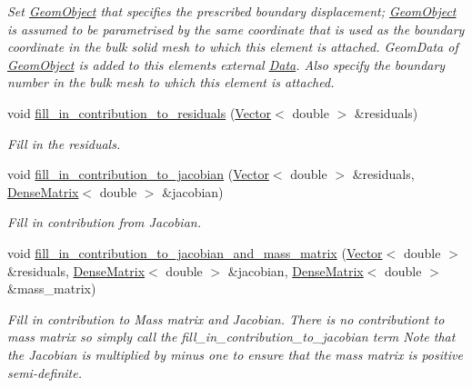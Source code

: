 \begin{DoxyCompactItemize}
\begin{DoxyCompactList}\small\item\em Set \hyperlink{classoomph_1_1GeomObject}{Geom\+Object} that specifies the prescribed boundary displacement; \hyperlink{classoomph_1_1GeomObject}{Geom\+Object} is assumed to be parametrised by the same coordinate that is used as the boundary coordinate in the bulk solid mesh to which this element is attached. Geom\+Data of \hyperlink{classoomph_1_1GeomObject}{Geom\+Object} is added to this element\textquotesingle{}s external \hyperlink{classoomph_1_1Data}{Data}. Also specify the boundary number in the bulk mesh to which this element is attached. \end{DoxyCompactList}\item 
void \hyperlink{classoomph_1_1ImposeDisplacementByLagrangeMultiplierElement_a1c65bc4013288cba24313e4cd1339919}{fill\+\_\+in\+\_\+contribution\+\_\+to\+\_\+residuals} (\hyperlink{classoomph_1_1Vector}{Vector}$<$ double $>$ \&residuals)
\begin{DoxyCompactList}\small\item\em Fill in the residuals. \end{DoxyCompactList}\item 
void \hyperlink{classoomph_1_1ImposeDisplacementByLagrangeMultiplierElement_a8f196eaf084264031cf36fb541978123}{fill\+\_\+in\+\_\+contribution\+\_\+to\+\_\+jacobian} (\hyperlink{classoomph_1_1Vector}{Vector}$<$ double $>$ \&residuals, \hyperlink{classoomph_1_1DenseMatrix}{Dense\+Matrix}$<$ double $>$ \&jacobian)
\begin{DoxyCompactList}\small\item\em Fill in contribution from Jacobian. \end{DoxyCompactList}\item 
void \hyperlink{classoomph_1_1ImposeDisplacementByLagrangeMultiplierElement_adf4f9f9359fbc7cd2acec4647dfa3c5a}{fill\+\_\+in\+\_\+contribution\+\_\+to\+\_\+jacobian\+\_\+and\+\_\+mass\+\_\+matrix} (\hyperlink{classoomph_1_1Vector}{Vector}$<$ double $>$ \&residuals, \hyperlink{classoomph_1_1DenseMatrix}{Dense\+Matrix}$<$ double $>$ \&jacobian, \hyperlink{classoomph_1_1DenseMatrix}{Dense\+Matrix}$<$ double $>$ \&mass\+\_\+matrix)
\begin{DoxyCompactList}\small\item\em Fill in contribution to Mass matrix and Jacobian. There is no contributiont to mass matrix so simply call the fill\+\_\+in\+\_\+contribution\+\_\+to\+\_\+jacobian term Note that the Jacobian is multiplied by minus one to ensure that the mass matrix is positive semi-\/definite. \end{DoxyCompactList}\item 

\end{DoxyCompactItemize}

